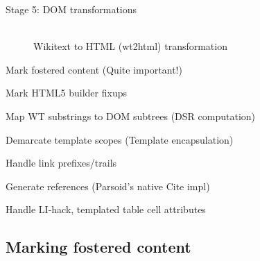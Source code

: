\documentclass[t,xcolor=dvipsnames]{beamer}
\begin{document}
\begin{frame}{Stage 5: DOM transformations}
\vspace*{-0.3in}
\begin{center}
\begin{figure}
  \hspace*{-0.3in}
  \\
  {\small Wikitext to HTML (wt2html) transformation}
\end{figure}
\end{center}

 {
\begin{enumerate}
  \small
  \item Mark fostered content (Quite important!)
  \item {\color{gray}Mark HTML5 builder fixups}
  \item Map WT substrings to DOM subtrees (DSR computation)
  \item Demarcate template scopes (Template encapsulation)
  {\color{gray}
  \item Handle link prefixes/trails
  \item Generate references (Parsoid's native Cite impl)
  \item Handle LI-hack, templated table cell attributes
  }
\end{enumerate}
}

\end{frame}

\subsection{Marking fostered content}
\end{document}
